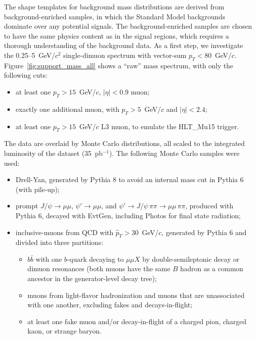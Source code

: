 \documentclass[12pt]{cms-tdr}
\begin{document}
The shape templates for background mass distributions are derived from
background-enriched samples, in which the Standard Model backgrounds
dominate over any potential signals.  The background-enriched samples
are chosen to have the same physics content as in the signal regions,
which requires a thorough understanding of the background data.  As a
first step, we investigate the 0.25--5~GeV/$c^2$ single-dimuon
spectrum with vector-sum $p_T < 80$~GeV/$c$.
Figure~\ref{fig:support_mass_all} shows a ``raw'' mass spectrum, with
only the following cuts:
\begin{itemize}
\item at least one $p_T > 15$~GeV/$c$, $|\eta| < 0.9$ muon;
\item exactly one additional muon, with $p_T > 5$~GeV/$c$ and $|\eta| < 2.4$;
\item at least one $p_T > 15$~GeV/$c$ L3 muon, to emulate the HLT\_Mu15 trigger.
\end{itemize}
The data are overlaid by Monte Carlo distributions, all scaled to the
integrated luminosity of the dataset (35~pb$^{-1}$).  The following Monte Carlo
samples were used:
\begin{itemize}
\item Drell-Yan, generated by Pythia 8 to avoid an internal mass cut
  in Pythia 6 (with pile-up);
\item prompt $J/\psi \to \mu\mu$, $\psi' \to \mu\mu$, and $\psi' \to
  J/\psi \, \pi\pi \to \mu\mu \, \pi\pi$, produced with Pythia 6,
  decayed with EvtGen, including Photos for final state radiation;
\item inclusive-muons from QCD with $\hat{p}_T > 30$~GeV/$c$,
  generated by Pythia 6 and divided into three partitions:
\begin{itemize}
\item $b\bar{b}$ with one $b$-quark decaying to $\mu\mu X$ by
  double-semileptonic decay or dimuon resonances (both muons have the
  same $B$ hadron as a common ancestor in the generator-level decay
  tree);
\item muons from light-flavor hadronization and muons that are
  unassociated with one another, excluding fakes and decays-in-flight;
\item at least one fake muon and/or decay-in-flight of a charged pion,
  charged kaon, or strange baryon.
\end{itemize}
\end{itemize}
\end{document}
